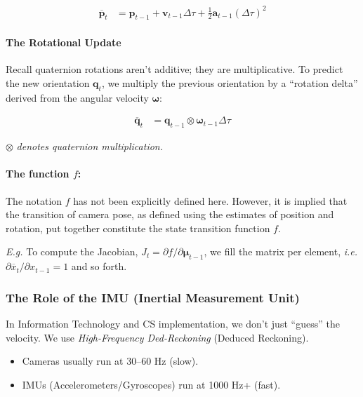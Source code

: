 \documentclass[11pt]{article}
\begin{document}
\begin{align*}
  \overline{\mathbf{p}}_t
  &= \mathbf{p}_{t-1} + \mathbf{v}_{t-1} \Delta \tau +
    \frac{1}{2} \mathbf{a}_{t-1} (\Delta \tau)^2
\end{align*}
\paragraph*{The Rotational Update}
\label{sec:orgd747a22}

Recall quaternion rotations aren't additive; they are
multiplicative.  To predict the new orientation
\(\mathbf{q}_t\), we multiply the previous orientation by
a ``rotation delta'' derived from the angular velocity
\(\boldsymbol{\omega}\):

\begin{align*}
  \overline{\mathbf{q}}_t &= \mathbf{q}_{t-1} \otimes
                 \boldsymbol{\omega}_{t-1} \Delta \tau
\end{align*}

\(\otimes\) \emph{denotes quaternion multiplication.}
\paragraph*{The function \(f\):}
\label{sec:orgfa6489c}
The notation \(f\) has not been explicitly defined here.
However, it is implied that the transition of camera
pose, as defined using the estimates of position and
rotation, put together constitute the state transition
function \(f\).

\emph{E.g.} To compute the Jacobian, \(J_t = \partial
f/\partial \boldsymbol{\mu}_{t-1}\), we fill the matrix
per element, \emph{i.e.} \(\partial \overline{x}_t/\partial
x_{t-1} = 1\)  and so forth.
\subsubsection{The Role of the IMU (Inertial Measurement Unit)}
\label{sec:orgd7def7b}

In Information Technology and CS implementation, we
don't just ``guess'' the velocity. We use \emph{High-Frequency
Ded-Reckoning} (Deduced Reckoning).

\begin{itemize}
\item Cameras usually run at 30--60 Hz (slow).
\item IMUs (Accelerometers/Gyroscopes) run at 1000 Hz+
(fast).
\end{itemize}
\end{document}
